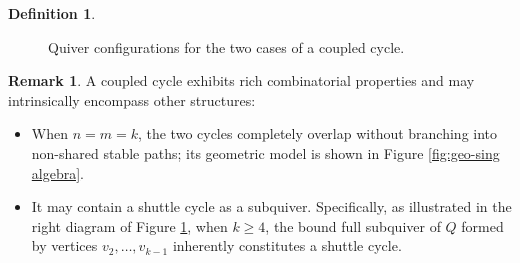 \documentclass[11pt]{amsart}
\numberwithin{equation}{section}
\theoremstyle{definition}
\newtheorem{remark}[theorem]{Remark}
\newtheorem{definition}[theorem]{Definition}
\begin{document}
\begin{definition}
\begin{figure}[htbp]
    \centering
{}
    \caption{Quiver configurations for the two cases of a coupled cycle.}
    \label{fig:coupled cycle}
\end{figure}
\end{definition}

\begin{remark}\label{rem:couple_special_cases}
A coupled cycle exhibits rich combinatorial properties and may intrinsically encompass other structures:
\begin{itemize}
    \item When \(n = m = k\), the two cycles completely overlap without branching into non-shared stable paths; its geometric model is shown in Figure \ref{fig:geo-sing algebra}. 
    \item It may contain a shuttle cycle as a subquiver. Specifically, as illustrated in the right diagram of Figure \ref{fig:coupled cycle}, when $k\ge 4$, the bound full subquiver of $Q$ formed by vertices $v_2,\dots,v_{k-1}$ inherently constitutes a shuttle cycle.
   
\end{itemize}
\end{remark}
\end{document}
